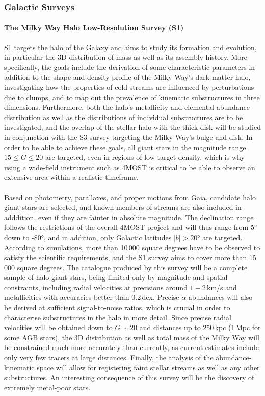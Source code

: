 \documentclass[a4paper,11pt]{article}
\begin{document}
\subsubsection{Galactic Surveys}
\paragraph{The Milky Way Halo Low-Resolution Survey (S1)}
S1 \citep{4mosts1} targets the halo of the Galaxy and aims to study its formation and evolution, in particular the 3D distribution of mass as well as its assembly history. More specifically, the goals include the derivation of some characteristic parameters in addition to the shape and density profile of the Milky Way's dark matter halo, investigating how the properties of cold streams are influenced by perturbations due to clumps, and to map out the prevalence of kinematic substructures in three dimensions. Furthermore, both the halo's metallicity and elemental abundance distribution as well as the distributions of individual substructures are to be investigated, and the overlap of the stellar halo with the thick disk will be studied in conjunction with the S3 survey targeting the Milky Way's bulge and disk. In order to be able to achieve these goals, all giant stars in the magnitude range $15\leq G\leq20$ are targeted, even in regions of low target density, which is why using a wide-field instrument such as 4MOST is critical to be able to observe an extensive area within a realistic timeframe.\\ \\
%
Based on photometry, parallaxes, and proper motions from Gaia, candidate halo giant stars are selected, and known members of streams are also included in adddition, even if they are fainter in absolute magnitude. The declination range follows the restrictions of the overall 4MOST project and will thus range from 5° down to -80°, and in addition, only Galactic latitudes $|b|>20$° are targeted. According to simulations, more than 10\,000 square degrees have to be observed to satisfy the scientific requirements, and the S1 survey aims to cover more than 15\,000 square degrees. The catalogue produced by this survey will be a complete sample of halo giant stars, being limited only by magnitude and spatial constraints, including radial velocities at precisions around $1-2$\,km/s and metallicities with accuracies better than 0.2\,dex. Precise $\alpha$-abundances will also be derived at sufficient signal-to-noise ratios, which is crucial in order to characterise substructures in the halo in more detail. Since precise radial velocities will be obtained down to $G\sim20$ and distances up to 250\,kpc (1\,Mpc for some AGB stars), the 3D distribution as well as total mass of the Milky Way will be constrained much more accurately than currently, as current estimates include only very few tracers at large distances. Finally, the analysis of the abundance-kinematic space will allow for registering faint stellar streams as well as any other substructures. An interesting consequence of this survey will be the discovery of extremely metal-poor stars.
%
\end{document}
